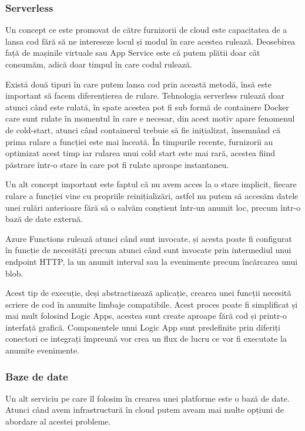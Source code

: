 \subsubsection{Serverless}

Un concept ce este promovat de către furnizorii de cloud este capacitatea de a lansa
cod fără să ne intereseze locul și modul în care acestea rulează. Deosebirea față
de mașinile virtuale sau App Service este că putem plătii doar cât consumăm, adică
doar timpul în care codul rulează.

Există două tipuri în care putem lansa cod prin această metodă, însă este important
să facem diferențierea de rulare. Tehnologia serverless rulează doar atunci când este rulată,
în spate acestea pot fi sub formă de containere Docker care sunt rulate în momentul
în care e necesar, din acest motiv apare fenomenul de cold-start, atunci când
containerul trebuie să fie inițializat, însemnând că prima rulare a funcției este mai înceată.
În timpurile recente, furnizorii au optimizat acest timp iar rularea unui cold start este mai rară,
acestea fiind păstrare într-o stare în care pot fi rulate aproape instantaneu.

Un alt concept important este faptul că nu avem acces la o stare implicit, fiecare
rulare a funcției vine cu propriile reinițializări, astfel nu putem să accesăm
datele unei rulări anterioare fără să o salvăm conștient într-un anumit loc, precum într-o bază de
date externă.

Azure Functions rulează atunci când sunt invocate, și acesta poate fi configurat
în funcție de necesități precum atunci când sunt invocate prin intermediul unui endpoint HTTP,
la un anumit interval sau la evenimente precum încărcarea unui blob.

Acest tip de execuție, deși abstractizează aplicație, crearea unei funcții
necesită scriere de cod în anumite limbaje compatibile. Acest proces poate fi
simplificat și mai mult folosind Logic Apps, acestea sunt create aproape fără cod
și printr-o interfață grafică. Componentele unui Logic App sunt predefinite prin diferiți conectori
ce integrați împreună vor crea un flux de lucru ce vor fi executate la anumite evenimente.

\subsubsection{Baze de date}

Un alt serviciu pe care îl folosim în crearea unei platforme este o bază de date.
Atunci când avem infrastructură în cloud putem aveam mai multe opțiuni de abordare al
acestei probleme.

